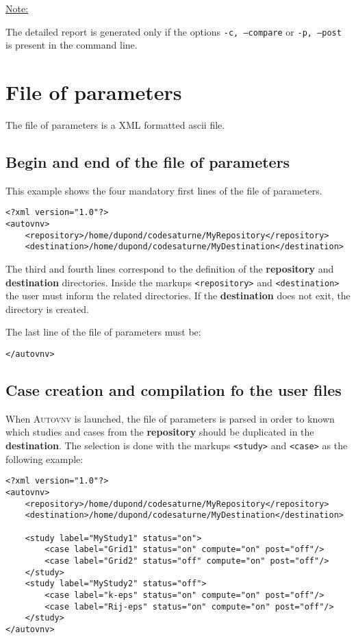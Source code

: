 \documentclass[a4paper,10pt,twoside]{article}
\begin{document}
\underline{Note:}

The detailed report is generated only if the options \texttt{-c, --compare}
or \texttt{-p, --post} is present in the command line.

\section{File of parameters}

The file of parameters is a XML formatted ascii file.

\subsection{Begin and end of the file of parameters}

This example shows the four mandatory first lines of the file of parameters.

\begin{verbatim}
<?xml version="1.0"?>
<autovnv>
    <repository>/home/dupond/codesaturne/MyRepository</repository>
    <destination>/home/dupond/codesaturne/MyDestination</destination>
\end{verbatim}

The third and fourth lines correspond to the definition of the
\textbf{repository} and \textbf{destination} directories.
Inside the markups \texttt{<repository>} and \texttt{<destination>} the user
must inform the related directories. If the \textbf{destination} does not exit,
the directory is created.

The last line of the file of parameters must be:

\begin{verbatim}
</autovnv>
\end{verbatim}

\subsection{Case creation and compilation fo the user files}

When \textsc{Autovnv} is launched, the file of parameters is parsed in order to
known which studies and cases from the \textbf{repository} should be duplicated
in the \textbf{destination}. The selection is done with the markups
\texttt{<study>} and \texttt{<case>} as the following example:

\begin{verbatim}
<?xml version="1.0"?>
<autovnv>
    <repository>/home/dupond/codesaturne/MyRepository</repository>
    <destination>/home/dupond/codesaturne/MyDestination</destination>

    <study label="MyStudy1" status="on">
        <case label="Grid1" status="on" compute="on" post="off"/>
        <case label="Grid2" status="off" compute="on" post="off"/>
    </study>
    <study label="MyStudy2" status="off">
        <case label="k-eps" status="on" compute="on" post="off"/>
        <case label="Rij-eps" status="on" compute="on" post="off"/>
    </study>
</autovnv>
\end{verbatim}
\end{document}
